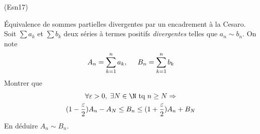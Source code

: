 \begin{tiny}(Esn17)\end{tiny} \label{Esn17} \'Equivalence de sommes partielles divergentes par un encadrement \og à la Cesaro\fg.\newline
Soit $\sum a_k$ et $\sum b_k$ deux séries à termes positifs \emph{divergentes} telles que $a_n \sim b_n$. On note
\begin{displaymath}
  A_n = \sum_{k=1}^n a_k,\hspace{0.5cm} B_n = \sum_{k=1}^n b_k
\end{displaymath}
Montrer que 
\begin{multline*}
\forall \varepsilon >0, \; \exists N \in \N \text{ tq } n\geq N \Rightarrow \\ 
  (1-\frac{\varepsilon}{2})A_n -A_N \leq B_n \leq (1+\frac{\varepsilon}{2})A_n + B_N
\end{multline*}
En déduire $A_n \sim B_n$.